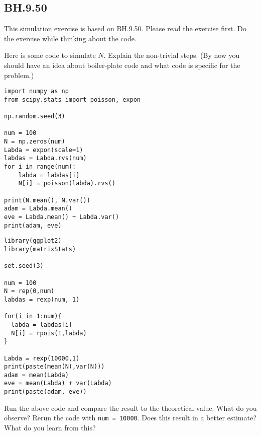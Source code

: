

\subsection{BH.9.50}

This simulation exercise is based on BH.9.50. Please read the exercise first. Do the exercise while thinking about the code.

\begin{exercise}
Here is some code to simulate $N$.  Explain the non-trivial steps. (By now you should have an idea about boiler-plate code and what code is specific for the problem.)

\begin{verbatim}
import numpy as np
from scipy.stats import poisson, expon

np.random.seed(3)

num = 100
N = np.zeros(num)
Labda = expon(scale=1)
labdas = Labda.rvs(num)
for i in range(num):
    labda = labdas[i]
    N[i] = poisson(labda).rvs()

print(N.mean(), N.var())
adam = Labda.mean()
eve = Labda.mean() + Labda.var()
print(adam, eve)
\end{verbatim}

\begin{verbatim}
library(ggplot2)
library(matrixStats)

set.seed(3)

num = 100
N = rep(0,num)
labdas = rexp(num, 1) 

for(i in 1:num){
  labda = labdas[i]
  N[i] = rpois(1,labda)
}

Labda = rexp(10000,1)
print(paste(mean(N),var(N)))
adam = mean(Labda)
eve = mean(Labda) + var(Labda)
print(paste(adam, eve))
\end{verbatim}

\end{exercise}

\begin{exercise}
Run the above code and compare the result to the theoretical value. What do you observe? Rerun the code with \texttt{num = 10000}. Does this result in a better estimate? What do you learn from this?
\end{exercise}

